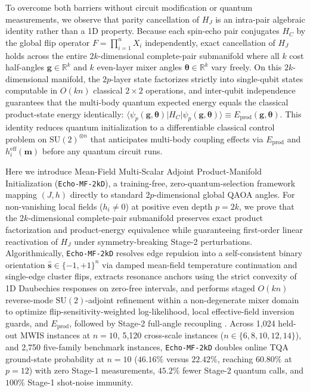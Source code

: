 \documentclass[10pt,a4paper]{article}
\begin{document}
To overcome both barriers without circuit modification or quantum measurements, we observe that parity cancellation of $H_J$ is an intra-pair algebraic identity rather than a 1D property. Because each spin-echo pair conjugates $H_C$ by the global flip operator $F = \prod_{i=1}^n X_i$ independently, exact cancellation of $H_J$ holds across the entire $2k$-dimensional complete-pair submanifold where all $k$ cost half-angles $\boldsymbol{g} \in \mathbb{R}^k$ and $k$ even-layer mixer angles $\boldsymbol{\theta} \in \mathbb{R}^k$ vary freely. On this $2k$-dimensional manifold, the $2p$-layer state factorizes strictly into single-qubit states computable in $O(kn)$ classical $2\times 2$ operations, and inter-qubit independence guarantees that the multi-body quantum expected energy equals the classical product-state energy identically: $\langle\psi_p(\boldsymbol{g},\boldsymbol{\theta})|H_C|\psi_p(\boldsymbol{g},\boldsymbol{\theta})\rangle \equiv E_{\mathrm{prod}}(\boldsymbol{g},\boldsymbol{\theta})$. This identity reduces quantum initialization to a differentiable classical control problem on $\mathrm{SU}(2)^{\otimes n}$ that anticipates multi-body coupling effects via $E_{\mathrm{prod}}$ and $h_i^{\mathrm{eff}}(\boldsymbol{m})$ before any quantum circuit runs.

Here we introduce Mean-Field Multi-Scalar Adjoint Product-Manifold Initialization (\texttt{Echo-MF-2kD}), a training-free, zero-quantum-selection framework mapping $(J, h)$ directly to standard $2p$-dimensional global QAOA angles. For non-vanishing local fields ($h_i \ne 0$) at positive even depth $p = 2k$, we prove that the $2k$-dimensional complete-pair submanifold preserves exact product factorization and product-energy equivalence while guaranteeing first-order linear reactivation of $H_J$ under symmetry-breaking Stage-2 perturbations. Algorithmically, \texttt{Echo-MF-2kD} resolves edge repulsion into a self-consistent binary orientation $\hat{\boldsymbol{s}} \in \{-1, +1\}^n$ via damped mean-field temperature continuation and single-edge cluster flips, extracts resonance anchors using the strict convexity of 1D Daubechies responses on zero-free intervals, and performs staged $O(kn)$ reverse-mode $\mathrm{SU}(2)$-adjoint refinement within a non-degenerate mixer domain to optimize flip-sensitivity-weighted log-likelihood, local effective-field inversion guards, and $E_{\mathrm{prod}}$, followed by Stage-2 full-angle recoupling \citep{dupont2022entanglement}. Across 1,024 held-out MWIS instances at $n=10$, 5,120 cross-scale instances ($n \in \{6, 8, 10, 12, 14\}$), and 2,750 five-family benchmark instances, \texttt{Echo-MF-2kD} doubles online TQA ground-state probability at $n=10$ ($46.16\%$ versus $22.42\%$, reaching $60.80\%$ at $p=12$) with zero Stage-1 measurements, $45.2\%$ fewer Stage-2 quantum calls, and $100\%$ Stage-1 shot-noise immunity.
\end{document}
